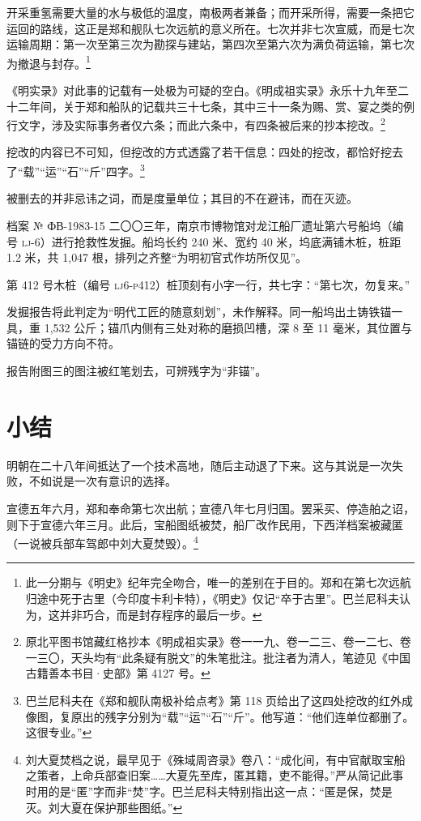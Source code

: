 开采重氢需要大量的水与极低的温度，南极两者兼备；而开采所得，需要一条把它运回的路线，这正是郑和舰队七次远航的意义所在。七次并非七次宣威，而是七次运输周期：第一次至第三次为勘探与建站，第四次至第六次为满负荷运输，第七次为撤退与封存。\footnote{此一分期与《明史》纪年完全吻合，唯一的差别在于目的。郑和在第七次远航归途中死于古里（今印度卡利卡特），《明史》仅记“卒于古里”。巴兰尼科夫认为，这并非巧合，而是封存程序的最后一步。}

《明实录》对此事的记载有一处极为可疑的空白。《明成祖实录》永乐十九年至二十二年间，关于郑和船队的记载共三十七条，其中三十一条为赐、赏、宴之类的例行文字，涉及实际事务者仅六条；而此六条中，有四条被后来的抄本挖改。\footnote{原北平图书馆藏红格抄本《明成祖实录》卷一一九、卷一二三、卷一二七、卷一三〇，天头均有“此条疑有脱文”的朱笔批注。批注者为清人，笔迹见《中国古籍善本书目·史部》第 4127 号。}

挖改的内容已不可知，但挖改的方式透露了若干信息：四处的挖改，都恰好挖去了“载”“运”“石”“斤”四字。\footnote{巴兰尼科夫在《郑和舰队南极补给点考》第 118 页给出了这四处挖改的红外成像图，复原出的残字分别为“载”“运”“石”“斤”。他写道：“他们连单位都删了。这很专业。”}

被删去的并非忌讳之词，而是度量单位；其目的不在避讳，而在灭迹。

\begin{archive}{档案 № ФВ-1983-15}
二〇〇三年，南京市博物馆对龙江船厂遗址第六号船坞（编号 \textsc{lj}-6）进行抢救性发掘。船坞长约 240 米、宽约 40 米，坞底满铺木桩，桩距 1.2 米，共 1{,}047 根，排列之齐整“为明初官式作坊所仅见”。

第 412 号木桩（编号 \textsc{lj6-p412}）桩顶刻有小字一行，共七字：“第七次，勿复来。”

发掘报告将此判定为“明代工匠的随意刻划”，未作解释。同一船坞出土铸铁锚一具，重 1{,}532 公斤；锚爪内侧有三处对称的磨损凹槽，深 8 至 11 毫米，其位置与锚链的受力方向不符。

报告附图三的图注被红笔划去，可辨残字为“非锚”。
\end{archive}

\section{小结}

明朝在二十八年间抵达了一个技术高地，随后主动退了下来。这与其说是一次失败，不如说是一次有意识的选择。

宣德五年六月，郑和奉命第七次出航；宣德八年七月归国。罢采买、停造舶之诏，则下于宣德六年三月。此后，宝船图纸被焚，船厂改作民用，下西洋档案被藏匿（一说被兵部车驾郎中刘大夏焚毁）。\footnote{刘大夏焚档之说，最早见于《殊域周咨录》卷八：“成化间，有中官献取宝船之策者，上命兵部查旧案……大夏先至库，匿其籍，吏不能得。”严从简记此事时用的是“匿”字而非“焚”字。巴兰尼科夫特别指出这一点：“匿是保，焚是灭。刘大夏在保护那些图纸。”}

